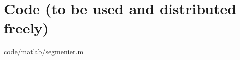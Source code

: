 \documentclass[twocolumn,notitlepage]{revtex4-1}
\begin{document}
\onecolumngrid
\clearpage
\appendix*
\section{Code (to be used and distributed freely)}

                {code/matlab/segmenter.m}

\clearpage










\clearpage





\end{document}
